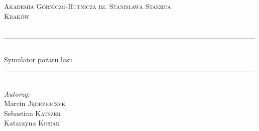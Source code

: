 \documentclass[a4paper, 11pt]{article}
\begin{document}
	
	\begin{titlepage}
		
		
		
		\newcommand{\HRule}{\rule{\linewidth}{0.5mm}} %
		
		\center %
		
		
		\textsc{\LARGE Akademia Górniczo-Hutnicza im. Stanisława Staszica}\\[1.5cm] %
		\textsc{\Large Kraków}\\[0.5cm] %
		\textsc{\large }\\[0.5cm] %
		
		
		\HRule \\[0.4cm]
		{\fontsize{38}{50}\selectfont Symulator pożaru lasu}
		\HRule \\[1.5cm]
		
		
		\Large \emph{Autorzy:}\\
		Marcin \textsc{Jędrzejczyk}\\ %
		Sebastian \textsc{Katszer}\\ %
		Katarzyna \textsc{Kosiak} \\[3cm]\ %
		

\end{titlepage}
\end{document}
